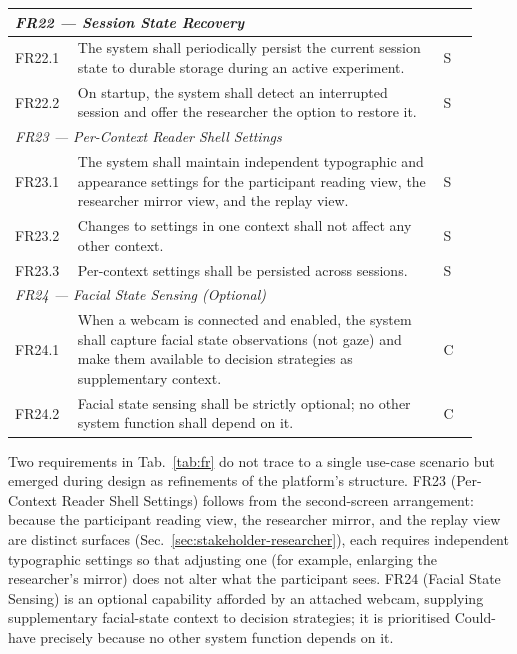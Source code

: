 \begin{longtable}{%
  p{0.12\linewidth}
  p{0.73\linewidth}
  p{0.07\linewidth}
}
\multicolumn{3}{l}{\textit{FR22 — Session State Recovery}} \\
\midrule
FR22.1 & The system shall periodically persist the current session state to
         durable storage during an active experiment. & S \\
FR22.2 & On startup, the system shall detect an interrupted session and offer
         the researcher the option to restore it. & S \\
\midrule

\multicolumn{3}{l}{\textit{FR23 — Per-Context Reader Shell Settings}} \\
\midrule
FR23.1 & The system shall maintain independent typographic and appearance
         settings for the participant reading view, the researcher mirror
         view, and the replay view. & S \\
FR23.2 & Changes to settings in one context shall not affect any other
         context. & S \\
FR23.3 & Per-context settings shall be persisted across sessions. & S \\
\midrule

\multicolumn{3}{l}{\textit{FR24 — Facial State Sensing (Optional)}} \\
\midrule
FR24.1 & When a webcam is connected and enabled, the system shall capture
         facial state observations (not gaze) and make them available to
         decision strategies as supplementary context. & C \\
FR24.2 & Facial state sensing shall be strictly optional; no other system
         function shall depend on it. & C \\

\end{longtable}
\endgroup

Two requirements in Tab.~\ref{tab:fr} do not trace to a single use-case scenario but emerged during design as refinements of the platform's structure.
FR23 (Per-Context Reader Shell Settings) follows from the second-screen arrangement: because the participant reading view, the researcher mirror, and the replay view are distinct surfaces (Sec.~\ref{sec:stakeholder-researcher}), each requires independent typographic settings so that adjusting one (for example, enlarging the researcher's mirror) does not alter what the participant sees.
FR24 (Facial State Sensing) is an optional capability afforded by an attached webcam, supplying supplementary facial-state context to decision strategies; it is prioritised Could-have precisely because no other system function depends on it.



